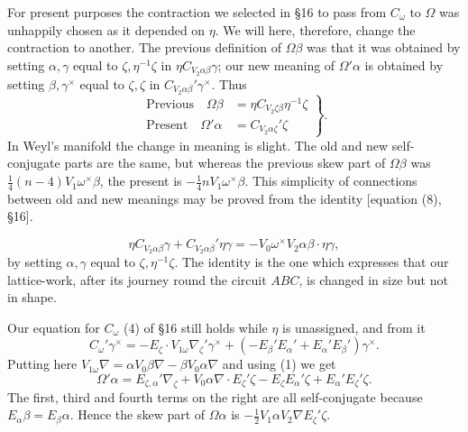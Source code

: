 \documentclass[11pt]{article}
\begin{document}
\indent For present purposes the contraction we selected in \S16 to pass from $C_\omega$ to $\Omega$ was unhappily chosen as it depended on $\eta$. We will here, therefore, change the contraction to another. The previous definition of $\Omega\beta$ was that it was obtained by setting $\alpha,\gamma$ equal to $\zeta,\eta^{-1}\zeta$ in $\eta C_{V_2\alpha\beta}\gamma$; our new meaning of $\Omega'\alpha$ is obtained by setting $\beta,\gamma^\times$ equal to $\zeta,\zeta$ in $C_{V_2\alpha\beta}'\gamma^\times$. Thus
\begin{equation}
\left.\begin{aligned}
\text{Previous}\quad \Omega\beta&=\eta C_{V_2\zeta\beta}\eta^{-1}\zeta\\
\text{Present}\quad \Omega'\alpha&=C_{V_2\alpha\zeta}'\zeta
\end{aligned}\right\}.\tag{1}
\end{equation}
\indent In Weyl's manifold the change in meaning is slight. The old and new self-conjugate parts are the same, but whereas the previous skew part of $\Omega\beta$ was $\tfrac14(n-4)V_1\omega^\times\beta$, the present is $-\tfrac14nV_1\omega^\times\beta$. This simplicity of connections between old and new meanings may be proved from the identity [equation (8), \S16].

\[
\eta C_{V_2\alpha\beta}\gamma+C_{V_2\alpha\beta}'\eta\gamma=-V_0\omega^\times V_2\alpha\beta\mathbin{\cdot}\eta\gamma,
\]
by setting $\alpha,\gamma$ equal to $\zeta,\eta^{-1}\zeta$. The identity is the one which expresses that our lattice-work, after its journey round the circuit $ABC$, is changed in size but not in shape.

\indent Our equation for $C_\omega$ (4) of \S16 still holds while $\eta$ is unassigned, and from it
\begin{equation}C_\omega'\gamma^\times=-E_\zeta\mathbin{\cdot}V_{1\omega}\nabla_\zeta'\gamma^\times+(-E_\beta'E_\alpha'+E_\alpha'E_\beta')\gamma^\times.\tag{2}\end{equation}
Putting here $V_{1\omega}\nabla=\alpha V_0\beta\nabla-\beta V_0\alpha\nabla$ and using (1) we get
\begin{equation}\Omega'\alpha=E_{\zeta,\alpha}'\nabla_\zeta+V_0\alpha\nabla\mathbin{\cdot}E_\zeta'\zeta-E_\zeta E_\alpha'\zeta+E_\alpha'E_\zeta'\zeta.\tag{3}\end{equation}
The first, third and fourth terms on the right are all self-conjugate because $E_\alpha\beta=E_\beta\alpha$. Hence the skew part of $\Omega\alpha$ is $-\tfrac12V_1\alpha V_2\nabla E_\zeta'\zeta$.
\end{document}
